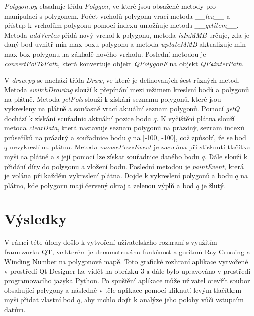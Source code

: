 \documentclass{article}
\begin{document}
\begin{spacing}{1.5}
\textit{Polygon.py} obsahuje třídu \textit{Polygon}, ve které jsou obsažené metody pro manipulaci s polygonem. Počet vrcholů polygonu vrací metoda \textit{\_\_len\_\_} a přístup k vrcholům polygonu pomocí indexu umožňuje metoda \textit{\_\_getitem\_\_}. Metoda \textit{addVertex} přidá nový vrchol k polygonu, metoda \textit{isInMMB} určuje, zda je daný bod uvnitř min-max boxu polygonu a metoda \textit{updateMMB} aktualizuje min-max box polygonu na základě nového vrcholu. Poslední metodou je \textit{convertPolToPath}, která konvertuje objekt \textit{QPolygonF} na objekt \textit{QPainterPath}. 

V \textit{draw.py} se nachází třída \textit{Draw}, ve které je definovaných šest různých metod. Metoda \textit{switchDrawing} slouží k přepínání mezi režimem kreslení bodů a polygonů na plátně. Metoda \textit{getPols} slouží k získání seznamu polygonů, které jsou vykresleny na plátně a současně vrací aktuální seznam polygonů. Pomocí \textit{getQ} dochází k získání souřadnic aktuální pozice bodu $q$. K vyčištění plátna slouží metoda \textit{clearData}, která nastavuje seznam polygonů na prázdný, seznam indexů průsečíků na prázdný a souřadnice bodu $q$ na [-100, -100], což způsobí, že se bod $q$ nevykreslí na plátno. Metoda \textit{mousePressEvent} je zavolána při stisknutí tlačítka myši na plátně a s její pomocí lze získat souřadnice daného bodu $q$. Dále slouží k přidání díry do polygonu a vložení bodu. Poslední metodou je \textit{paintEvent}, která je volána při každém vykreslení plátna. Dojde k vykreslení polygonů a bodu $q$ na plátno, kde polygonu mají červený okraj a zelenou výplň a bod $q$ je žlutý. 

\section{Výsledky}
V rámci této úlohy došlo k vytvoření uživatelského rozhraní s využitím frameworku QT, ve kterém je demonstrována funkčnost algoritmů Ray Crossing a Winding Number na polygonové mapě. Toto grafické rozhraní aplikace vytvořené v prostředí Qt Designer lze vidět na obrázku 3 a dále bylo upravováno v prostředí programovacího jazyka Python. Po spuštění aplikace může uživatel otevřít soubor obsahující polygony a následně v těle aplikace pomocí kliknutí levým tlačítkem myši přidat vlastní bod $q$, aby mohlo dojít k analýze jeho polohy vůči vstupním datům.


\end{spacing}
\end{document}
